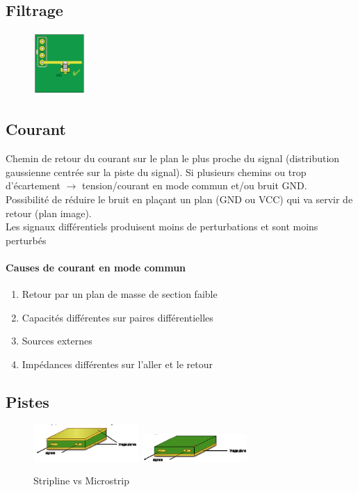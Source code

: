 \documentclass[resume]{subfiles}
\begin{document}
\begin{multicols}{3}
\subsection{Filtrage}
\begin{figure}[H]
\centering
\includegraphics[width=2.00cm]{img_2.png}
\end{figure}
\subsection{Courant}
Chemin de retour du courant sur le plan le plus proche du signal (distribution gaussienne centrée sur la piste du signal). Si plusieurs chemins ou trop d'écartement $\longrightarrow$ tension/courant en mode commun et/ou bruit GND.\\
Possibilité de réduire le bruit en plaçant un plan (GND ou VCC) qui va servir de retour (plan image).\\
Les signaux différentiels produisent moins de perturbations et sont moins perturbés
\paragraph{Causes de courant en mode commun}
\begin{enumerate}
\item Retour par un plan de masse de section faible
\item Capacités différentes sur paires différentielles
\item Sources externes
\item Impédances différentes sur l'aller et le retour
\end{enumerate}

\subsection{Pistes}
\begin{figure}[H]
\centering
\includegraphics[width=4.00cm]{img_3.png}
\includegraphics[width=4.00cm]{img_4.png}
\caption{Stripline vs Microstrip}
\end{figure}

\end{multicols}
\end{document}
